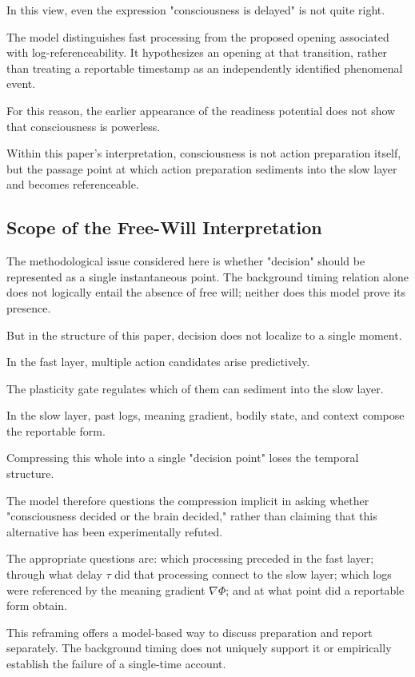 In this view, even the expression "consciousness is delayed" is not quite right.

The model distinguishes fast processing from the proposed opening associated with log-referenceability. It hypothesizes an opening at that transition, rather than treating a reportable timestamp as an independently identified phenomenal event.

For this reason, the earlier appearance of the readiness potential does not show that consciousness is powerless.

Within this paper's interpretation, consciousness is not action preparation itself, but the passage point at which action preparation sediments into the slow layer and becomes referenceable.

\subsection{Scope of the Free-Will Interpretation}


The methodological issue considered here is whether "decision" should be represented as a single instantaneous point. The background timing relation alone does not logically entail the absence of free will; neither does this model prove its presence.

But in the structure of this paper, decision does not localize to a single moment.

In the fast layer, multiple action candidates arise predictively.

The plasticity gate regulates which of them can sediment into the slow layer.

In the slow layer, past logs, meaning gradient, bodily state, and context compose the reportable form.

Compressing this whole into a single "decision point" loses the temporal structure.

The model therefore questions the compression implicit in asking whether "consciousness decided or the brain decided," rather than claiming that this alternative has been experimentally refuted.

The appropriate questions are: which processing preceded in the fast layer; through what delay $\tau$ did that processing connect to the slow layer; which logs were referenced by the meaning gradient $\nabla\Phi$; and at what point did a reportable form obtain.

This reframing offers a model-based way to discuss preparation and report separately. The background timing does not uniquely support it or empirically establish the failure of a single-time account.

